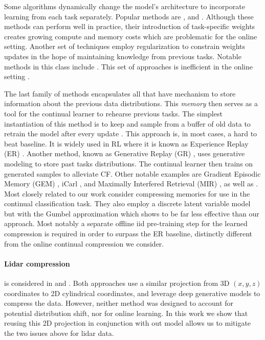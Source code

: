 \documentclass[colorinlistoftodos]{article} %
\begin{document}
Some algorithms dynamically change the model’s architecture to incorporate learning from each task separately. Popular methods are \citet{rusu2016progressive}, \citet{li2018learning} and  \citet{fernando2017pathnet}. Although these methods can perform well in practice, their introduction of task-specific weights creates growing compute and memory costs which are problematic for the online setting. %
Another set of techniques employ regularization to constrain weights updates in the hope of maintaining knowledge from previous tasks. Notable methods in this class include \citep{kirkpatrick2017overcoming,huszar2017quadratic,zenke2017continual,nguyen2017variational, chaudhry2018riemannian}. This set of approaches is inefficient in the online setting \cite{chaudhry2019continual}.

The last family of methods encapsulates all that have mechanism to store information about the previous data distributions. This \textit{memory} then serves as a tool for the continual learner to rehearse previous tasks. The simplest instantiation of this method is to keep and sample from a buffer of old data to retrain the model after every update \citep{chaudhry2019continual}. This approach is, in most cases, a hard to beat baseline. It is widely used in RL where it is known as Experience Replay (ER) \citep{lin1993reinforcement}. Another method, known as Generative Replay (GR) \citep{shin2017continual}, uses generative modeling to store past tasks distributions. The continual learner then trains on generated samples to alleviate CF. Other notable examples are Gradient Episodic Memory (GEM) \citep{lopez2017gradient}, iCarl \citep{rebuffi2017icarl}, and Maximally Interfered Retrieval (MIR) \cite{aljundi2019online}, as well as \citep{aljundi2018Online, hu2018overcoming}. Most closely related to our work \cite{scalable2017} consider compressing memories for use in the continual classification task. They also employ a discrete latent variable model but with the Gumbel approximation which shows to be far less effective than our approach. Most notably a separate offline iid pre-training step for the learned compression is required in order to surpass the ER baseline, distinctly different from the online continual compression we consider. 

\paragraph{Lidar compression} is considered in \cite{tu2019point} and \cite{caccia2018deep}. Both approaches use a similar projection from 3D $(x,y,z)$ coordinates to 2D cylindrical coordinates, and leverage deep generative models to compress the data. However, neither method was designed to account for potential distribution shift, nor for online learning. In this work we show that reusing this 2D projection in conjunction with out model allows us to mitigate the two issues above for lidar data. 
\end{document}
